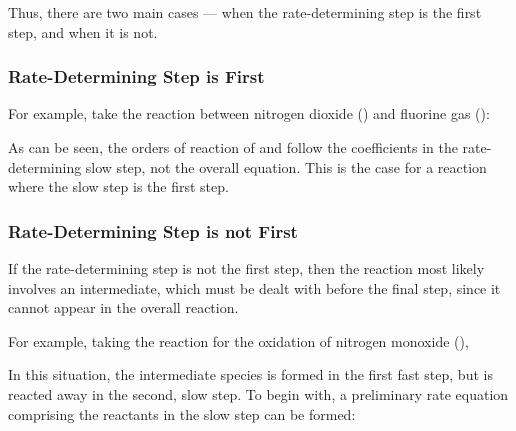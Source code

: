 			Thus, there are two main cases --- when the rate-determining step is the first step, and when it is not.

			\pagebreak
			\subsubsection{Rate-Determining Step is First}

				For example, take the reaction between nitrogen dioxide () and fluorine gas ():


				As can be seen, the orders of reaction of  and  follow the coefficients in the rate-determining slow
				step, not the overall equation. This is the case for a reaction where the slow step is the first step.



			\subsubsection{Rate-Determining Step is not First}

				If the rate-determining step is not the first step, then the reaction most likely involves an intermediate, which must be
				dealt with before the final step, since it cannot appear in the overall reaction.

				For example, taking the reaction for the oxidation of nitrogen monoxide (),


				In this situation, the intermediate species  is formed in the first fast step, but is reacted away in the second,
				slow step. To begin with, a preliminary rate equation comprising the reactants in the slow step can be formed:

